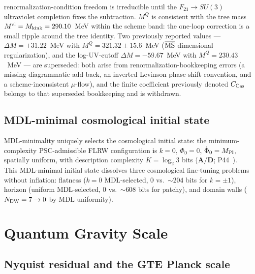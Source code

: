 \documentclass[11pt]{article}
\theoremstyle{remark}
\newcommand{\Mkink}{M_{\rm kink}}
\newcommand{\CatAD}{\textbf{A/D}}
\begin{document}
renormalization-condition freedom is irreducible until the $F_{21}\to SU(3)$
ultraviolet completion fixes the subtraction.
$M^Q$ is consistent with the tree mass $M^{\rm cl} = \Mkink = 290.10$~MeV within
the scheme band: the one-loop correction is a small ripple around the tree identity.
Two previously reported values --- $\Delta M = +31.22$~MeV with
$M^Q = 321.32 \pm 15.6$~MeV ($\overline{\rm MS}$ dimensional regularization), and the
log-UV-cutoff $\Delta M = -59.67$~MeV with $M^Q = 230.43$~MeV --- are superseded:
both arise from renormalization-bookkeeping errors (a missing diagrammatic
add-back, an inverted Levinson phase-shift convention, and a scheme-inconsistent
$\mu$-flow), and the finite coefficient previously denoted $C_{\rm Cas}$ belongs to
that superseded bookkeeping and is withdrawn.

\subsection{MDL-minimal cosmological initial state}
\label{ssec:mdl_ic}

MDL-minimality uniquely selects the cosmological initial state:
the minimum-complexity PSC-admissible FLRW configuration is
$k=0$, $\Phi_0=0$, $\dot\Phi_0=M_{\rm Pl}$, spatially uniform, with description
complexity $K=\log_2 3$ bits ($\CatAD$; P44~\cite{SpivackQGR}).
This MDL-minimal initial state dissolves three cosmological fine-tuning problems
without inflation:
flatness ($k=0$ MDL-selected, 0 vs.\ $\sim204$ bits for $k=\pm1$),
horizon (uniform MDL-selected, 0 vs.\ $\sim608$ bits for patchy),
and domain walls ($N_{\rm DW}=7\to0$ by MDL uniformity).

\section{Quantum Gravity Scale}
\label{sec:qgr}

\subsection{Nyquist residual and the GTE Planck scale}
\label{ssec:nyquist_planck}
\end{document}
